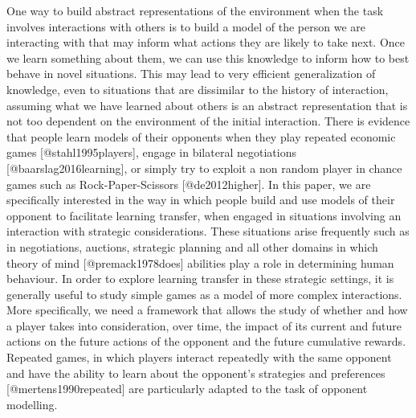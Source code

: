\documentclass[man,floatsintext]{apa6}
\begin{document}
One way to build abstract representations of the environment when the task involves interactions with others is to build a model of the person we are interacting with that may inform what actions they are likely to take next. Once we learn something about them, we can use this knowledge to inform how to best behave in novel situations. This may lead to very efficient generalization of knowledge, even to situations that are dissimilar to the history of interaction, assuming what we have learned about others is an abstract representation that is not too dependent on the environment of the initial interaction. There is evidence that people learn models of their opponents when they play repeated economic games {[}@stahl1995players{]}, engage in bilateral negotiations {[}@baarslag2016learning{]}, or simply try to exploit a non random player in chance games such as Rock-Paper-Scissors {[}@de2012higher{]}. In this paper, we are specifically interested in the way in which people build and use models of their opponent to facilitate learning transfer, when engaged in situations involving an interaction with strategic considerations. These situations arise frequently such as in negotiations, auctions, strategic planning and all other domains in which theory of mind {[}@premack1978does{]} abilities play a role in determining human behaviour. In order to explore learning transfer in these strategic settings, it is generally useful to study simple games as a model of more complex interactions. More specifically, we need a framework that allows the study of whether and how a player takes into consideration, over time, the impact of its current and future actions on the future actions of the opponent and the future cumulative rewards. Repeated games, in which players interact repeatedly with the same opponent and have the ability to learn about the opponent's strategies and preferences {[}@mertens1990repeated{]} are particularly adapted to the task of opponent modelling.
\end{document}
